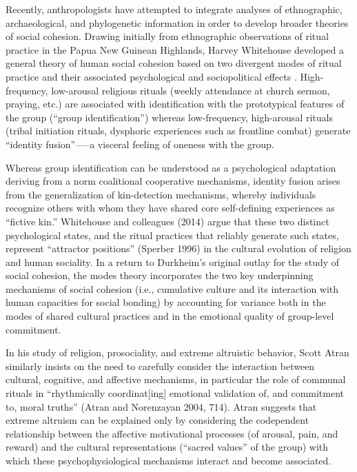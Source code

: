 Recently, anthropologists have attempted to integrate analyses of ethnographic, archaeological, and phylogenetic information in order to develop broader theories of social cohesion. Drawing initially from ethnographic observations of ritual practice in the Papua New Guinean Highlands, Harvey Whitehouse developed a general theory of human social cohesion based on two divergent modes of ritual practice and their associated psychological and sociopolitical effects \citep{Whitehouse1996}. High-frequency, low-arousal religious rituals (weekly attendance at church sermon, praying, etc.) are associated with identification with the prototypical features of the group (“group identification”) whereas low-frequency, high-arousal rituals (tribal initiation rituals, dysphoric experiences such as frontline combat) generate “identity fusion”—--a visceral feeling of oneness with the group.

Whereas group identification can be understood as a psychological adaptation deriving from a norm coalitional cooperative mechanisms, identity fusion arises from the generalization of kin-detection mechanisms, whereby individuals recognize others with whom they have shared core self-defining experiences as ``fictive kin.'' Whitehouse and colleagues (2014) argue that these two distinct psychological states, and the ritual practices that reliably generate such states, represent ``attractor positions'' (Sperber 1996) in the cultural evolution of religion and human sociality. In a return to Durkheim’s original outlay for the study of social cohesion, the modes theory incorporates the two key underpinning mechanisms of social cohesion (i.e., cumulative culture and its interaction with human capacities for social bonding) by accounting for variance both in the modes of shared cultural practices and in the emotional quality of group-level commitment.

In his study of religion, prosociality, and extreme altruistic behavior, Scott Atran similarly insists on the need to carefully consider the interaction between cultural, cognitive, and affective mechanisms, in particular the role of communal rituals in “rhythmically coordinat[ing] emotional validation of, and commitment to, moral truths” (Atran and Norenzayan 2004, 714). Atran suggests that extreme altruism can be explained only by considering the codependent relationship between the affective motivational processes (of arousal, pain, and reward) and the cultural representations (“sacred values” of the group) with which these psychophysiological mechanisms interact and become associated.

